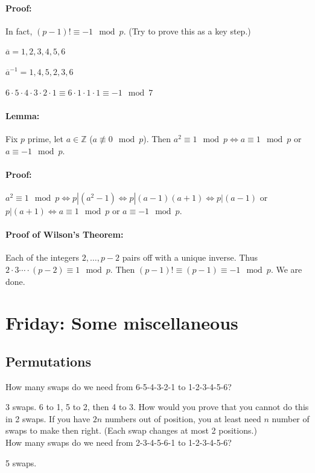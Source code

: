 \documentclass[a4paper, 11pt, twoside]{article}
\begin{document}
\paragraph{Proof:} In fact, $(p-1)!\equiv -1 \mod p$. (Try to prove this as a key step.)

$\overline{a}=1, 2, 3, 4, 5, 6$

$\overline{a}^{-1}=1, 4, 5, 2, 3, 6$

$6\cdot 5\cdot 4\cdot 3\cdot 2\cdot 1 \equiv 6\cdot 1\cdot 1\cdot 1 \equiv -1 \mod 7$

\paragraph{Lemma:} Fix $p$ prime, let $a\in\mathbb{Z}$ ($a\not\equiv 0\mod p$). Then $a^2\equiv 1 \mod p \iff a\equiv 1\mod p$ or $a\equiv -1 \mod p$.

\paragraph{Proof:} $a^2\equiv 1 \mod p\iff p|(a^2-1)\iff p|(a-1)(a+1) \iff p|(a-1)$ or $p|(a+1) \iff a\equiv 1 \mod p$ or  $a\equiv -1 \mod p$.

\paragraph{Proof of Wilson's Theorem:} Each of the integers $2,\dots, p-2$ pairs off with a unique inverse. Thus $2\cdot 3\cdots \cdot (p-2)\equiv 1\mod p$. Then $(p-1)!\equiv (p-1)\equiv -1\mod p$. We are done.

\section{Friday: Some miscellaneous}
\subsection{Permutations}
How many swaps do we need from 6-5-4-3-2-1 to 1-2-3-4-5-6?

3 swaps. 6 to 1, 5 to 2, then 4 to 3. How would you prove that you cannot do this in 2 swaps. If you have $2n$ numbers out of position, you at least need $n$ number of swaps to make then right. (Each swap changes at most 2 positions.)\\

How many swaps do we need from 2-3-4-5-6-1 to 1-2-3-4-5-6?

5 swaps.
\end{document}
